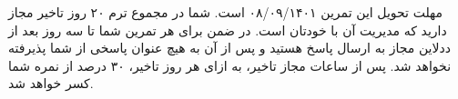 \noindent
مهلت تحویل این تمرین ۰۸/۰۹/۱۴۰۱ است. شما در مجموع ترم ۲۰ روز تاخیر مجاز دارید که مدیریت آن با خودتان است. در
ضمن برای هر تمرین شما تا سه روز بعد از ددلاین مجاز به ارسال پاسخ هستید و پس از آن به هیچ عنوان پاسخی از شما پذیرفته
نخواهد شد. پس از ساعات مجاز تاخیر، به ازای هر روز تاخیر، ۳۰ درصد از نمره شما کسر خواهد شد.